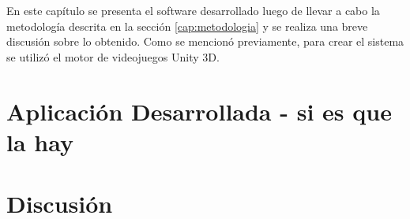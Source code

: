 En este capítulo se presenta el software desarrollado luego de llevar a cabo la metodología descrita en la sección \ref{cap:metodologia} y se realiza una breve discusión sobre lo obtenido. Como se mencionó previamente, para crear el sistema se utilizó el motor de videojuegos Unity 3D.
\section{Aplicación Desarrollada - si es que la hay}
\section{Discusión}
